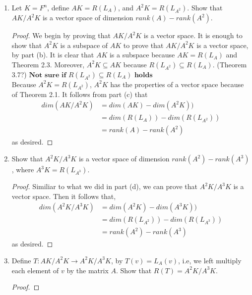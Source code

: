 \documentclass[11pt]{scrartcl}
\begin{document}
\begin{enumerate}[label=\alph*.]
	\item{
	      Let $K = F^n$, define $AK = R(L_A)$, and $A^2K = R(L_{A^2})$.
	      Show that $AK/A^2K$ is a vector space of dimension $rank(A) - rank(A^2)$.
	      \begin{proof}
		      We begin by proving that $AK/A^2K$ is a vector space. It is enough to show that $A^2K$ is a subspace of $AK$
		      to prove that $AK/A^2K$ is a vector space, by part (b). It is clear that $AK$ is a subspace because $AK = R(L_A)$
		      and Theorem 2.3. Moreover, $A^2K \subseteq AK$ because $R(L_{A^2}) \subseteq R(L_A)$. (Theorem 3.7?)
		      $\textbf{Not sure if }  $$R(L_{A^2}) \subseteq R(L_A)$$ \textbf{ holds }$ \\
				      Because $A^2K = R(L_{A^2})$, $A^2K$ has the properties of a vector space because of Theorem 2.1.
		      It follows from part (c) that
		      \begin{align*}
			      dim(AK/A^2K) & = dim(AK) - dim(A^2K))          \\
			                   & = dim(R(L_A)) - dim(R(L_{A^2})) \\
			                   & = rank(A) - rank(A^2)
		      \end{align*}
		      as desired.
	      \end{proof}
	      }
	\item{
	      Show that $A^2K/A^3K$ is a vector space of dimension $rank(A^2) - rank(A^3)$, where $A^3K= R(L_{A^3})$.
	      \begin{proof}
		      Similiar to what we did in part (d), we can prove that $A^2K/A^3K$ is a vector space.
		      Then it follows that,
		      \begin{align*}
			      dim(A^2K/A^3K) & = dim(A^2K) - dim(A^3K))            \\
			                     & = dim(R(L_{A^2})) - dim(R(L_{A^3})) \\
			                     & = rank(A^2) - rank(A^3)
		      \end{align*}
		      as desired.
	      \end{proof}
	      }
	\item{
	      Define $T: AK/A^2K \rightarrow A^2K/A^3K$, by $T(v) = L_A(v)$, i.e, we left multiply each element of $v$ by the matrix $A$.
	      Show that $R(T) = A^2K/A^3K$.
	      \begin{proof}


\end{proof}}
\end{enumerate}
\end{document}

